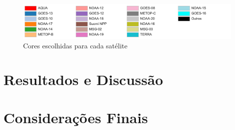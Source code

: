 \documentclass[cic,tc]{iiufrgs}
\begin{document}
\begin{figure}[H]
    \caption{Cores escolhidas para cada satélite}
    \begin{center}
        \includegraphics[width=35em]{cores_satelites}
    \end{center}
    \label{fig:cores_satelites}
\end{figure}




\chapter{Resultados e Discussão}




\chapter{Considerações Finais}





\end{document}
